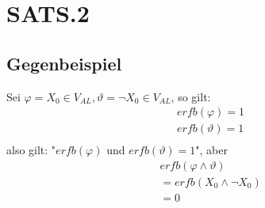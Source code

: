 \documentclass[12pt, a4paper]{article}
\begin{document}
\section*{SATS.2}
\subsection*{Gegenbeispiel}
Sei $\varphi = X_0 \in V_{AL}, \vartheta = \neg X_0 \in V_{AL}$, so gilt:
\begin{equation}
\begin{split}
&erfb(\varphi) = 1\\
&erfb(\vartheta) = 1\\
\end{split}
\end{equation}
also gilt: "$erfb(\varphi)$ und $erfb(\vartheta) = 1$", aber
\begin{equation}
\begin{split}
&erfb(\varphi \wedge \vartheta)\\
&=erfb( X_0 \wedge \neg X_0)\\
&=0
\end{split}
\end{equation}
\end{document}
